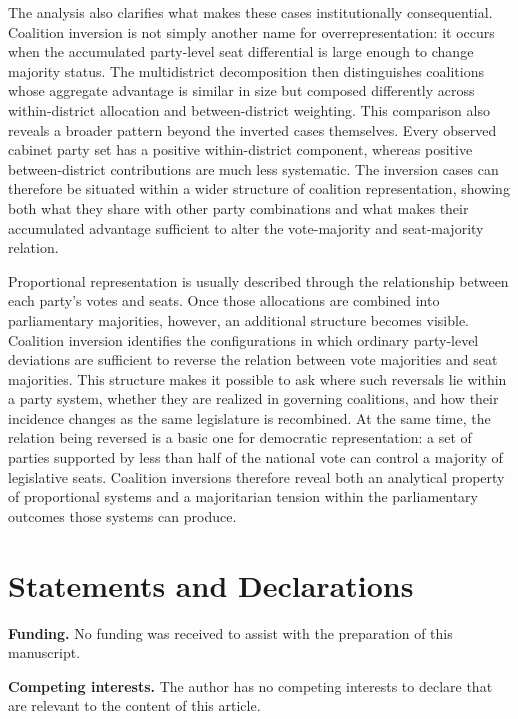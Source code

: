 \documentclass[11pt]{article}
\begin{document}
The analysis also clarifies what makes these cases institutionally
consequential. Coalition inversion is not simply another name for
overrepresentation: it occurs when the accumulated party-level seat
differential is large enough to change majority status. The multidistrict
decomposition then distinguishes coalitions whose aggregate advantage is
similar in size but composed differently across within-district allocation
and between-district weighting. This comparison also reveals a broader
pattern beyond the inverted cases themselves. Every observed cabinet party
set has a positive within-district component, whereas positive
between-district contributions are much less systematic. The inversion cases
can therefore be situated within a wider structure of coalition
representation, showing both what they share with other party combinations
and what makes their accumulated advantage sufficient to alter the
vote-majority and seat-majority relation.

Proportional representation is usually described through the relationship
between each party's votes and seats. Once those allocations are combined
into parliamentary majorities, however, an additional structure becomes
visible. Coalition inversion identifies the configurations in which ordinary
party-level deviations are sufficient to reverse the relation between vote
majorities and seat majorities. This structure makes it possible to ask where
such reversals lie within a party system, whether they are realized in
governing coalitions, and how their incidence changes as the same legislature
is recombined. At the same time, the relation being reversed is a basic one
for democratic representation: a set of parties supported by less than half
of the national vote can control a majority of legislative seats. Coalition
inversions therefore reveal both an analytical property of proportional
systems and a majoritarian tension within the parliamentary outcomes those
systems can produce.



\section*{Statements and Declarations}  

\textbf{Funding.} No funding was received to assist with the preparation of this manuscript.

\textbf{Competing interests.} The author has no competing interests to declare that are relevant to the content of this article.
\end{document}
